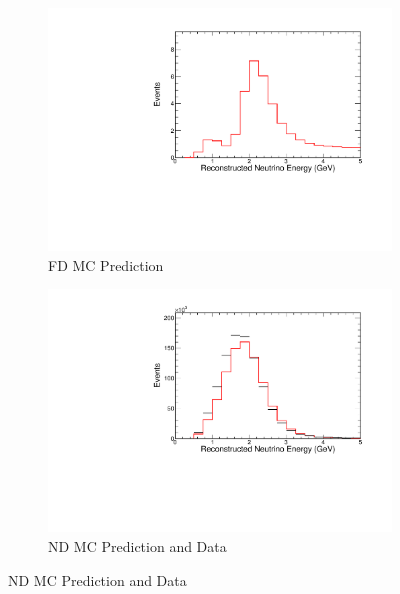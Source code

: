 {\begin{figure}
\end{figure}




\begin{figure}
\begin{center}
\begin{subfigure}[c]{0.49\textwidth}
\includegraphics[width=\textwidth]{figures/systs/prediction/fd_mc_prediction_MvNCRES.pdf}
\caption*{FD MC Prediction}
\end{subfigure}
\begin{subfigure}[c]{0.49\textwidth}
\includegraphics[width=\textwidth]{figures/systs/prediction/nd_mc_prediction_MvNCRES.pdf}
\caption*{ND MC Prediction and Data}
\end{subfigure}

\vspace{20pt}


\end{center}
\end{figure}}
